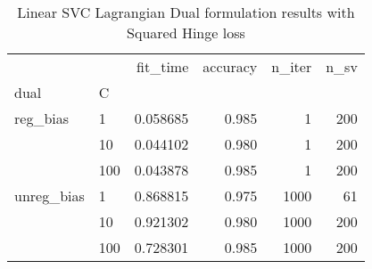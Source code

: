 \begin{table}[H]
\centering
\caption{Linear SVC Lagrangian Dual formulation results with Squared Hinge loss}
\label{linear_lagrangian_dual_l2_svc_cv_results}
\begin{tabular}{llrrrr}
\toprule
           &     &  fit\_time &  accuracy &  n\_iter &  n\_sv \\
dual & C &           &           &         &       \\
\midrule
reg\_bias & 1   &  0.058685 &     0.985 &       1 &   200 \\
           & 10  &  0.044102 &     0.980 &       1 &   200 \\
           & 100 &  0.043878 &     0.985 &       1 &   200 \\
unreg\_bias & 1   &  0.868815 &     0.975 &    1000 &    61 \\
           & 10  &  0.921302 &     0.980 &    1000 &   200 \\
           & 100 &  0.728301 &     0.985 &    1000 &   200 \\
\bottomrule
\end{tabular}
\end{table}
